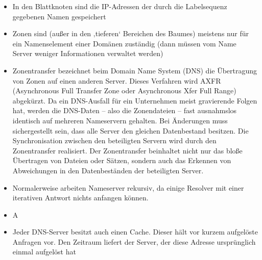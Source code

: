 \begin{itemize}
    \item In den Blattknoten sind die IP-Adressen der durch die Labelsequenz gegebenen Namen gespeichert
\end{itemize}

\begin{itemize}
    \item Zonen sind (außer in den ‚tieferen‘ Bereichen des Baumes) meistens nur für ein Namenselement einer Domänen zuständig (dann müssen vom Name Server weniger Informationen verwaltet werden)
\end{itemize}

\begin{itemize}
    \item Zonentransfer bezeichnet beim Domain Name System (DNS) die Übertragung von Zonen auf einen anderen Server. Dieses Verfahren wird AXFR (Asynchronous Full Transfer Zone oder Asynchronous Xfer Full Range) abgekürzt. Da ein DNS-Ausfall für ein Unternehmen meist gravierende Folgen hat, werden die DNS-Daten – also die Zonendateien – fast ausnahmslos identisch auf mehreren Nameservern gehalten. Bei Änderungen muss sichergestellt sein, dass alle Server den gleichen Datenbestand besitzen. Die Synchronisation zwischen den beteiligten Servern wird durch den Zonentransfer realisiert. Der Zonentransfer beinhaltet nicht nur das bloße Übertragen von Dateien oder Sätzen, sondern auch das Erkennen von Abweichungen in den Datenbeständen der beteiligten Server.
\end{itemize}

\begin{itemize}
    \item Normalerweise arbeiten Nameserver rekursiv, da einige Resolver mit einer iterativen Antwort nichts anfangen können.
\end{itemize}

\begin{itemize}
    \item \todo A
\end{itemize}

\begin{itemize}
    \item Jeder DNS-Server besitzt auch einen Cache.
    Dieser hält vor kurzem aufgelöste Anfragen vor. Den Zeitraum liefert der Server, der diese Adresse ursprünglich einmal aufgelöst hat
\end{itemize}

